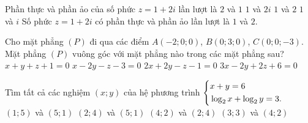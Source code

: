 \begin{ex}%
Phần thực và phần ảo của số phức $z=1+2i$ lần lượt là
\choice
{$2$ và $1$}
{$1$ và $2i$}
{\True $1$ và $2$}
{$1$ và $i$}
\loigiai
{Số phức $z=1+2i$ có phần thực và phần ảo lần lượt là $1$ và $2$.}
\end{ex}

\begin{ex}%
		Cho mặt phẳng $(P)$ đi qua các điểm $A\left(-2;0;0\right)$, $B\left(0;3;0\right)$, $C\left(0;0;-3\right)$. Mặt phẳng $(P)$ vuông góc với mặt phẳng nào trong các mặt phẳng sau? 
		\choice
		{$x+y+z+1=0$}
		{$x-2y-z-3=0$}
		{\True $2x+2y-z-1=0$}
		{$3x-2y+2z+6=0$}
	\end{ex}

	\begin{ex}%
		Tìm tất cả các nghiệm $(x;y)$ của hệ phương trình $\left\{\begin{aligned}
			& x+y=6 \\ 
			& \log_2x+\log_2y=3.\end{aligned}\right.$
		\choice
		{$\left(1;5\right)$ và $\left(5;1\right)$}
		{$\left(2;4\right)$ và $\left(5;1\right)$}
		{\True $\left(4;2\right)$ và $\left(2;4\right)$}
		{$\left(3;3\right)$ và $\left(4;2\right)$}
	\end{ex}

